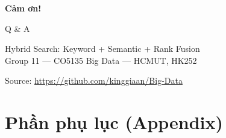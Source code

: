 \documentclass[aspectratio=169, 11pt]{beamer}
\begin{document}
\begin{frame}[plain]
\begin{center}

\vspace{2cm}
{\Huge\textbf{\textcolor{accentTeal}{Cảm ơn!}}}

\vspace{0.5cm}
{\LARGE Q \& A}

\vspace{1cm}

{\large\textcolor{textLight}{Hybrid Search: Keyword + Semantic + Rank Fusion}}\\
\vspace{0.2cm}
{\small\textcolor{textMuted}{Group 11 --- CO5135 Big Data --- HCMUT, HK252}}

\vspace{1cm}
{\small\textcolor{textMuted}{Source: \url{https://github.com/kinggiaan/Big-Data}}}

\end{center}
\end{frame}

\appendix
\section{Phần phụ lục (Appendix)}
\end{document}

